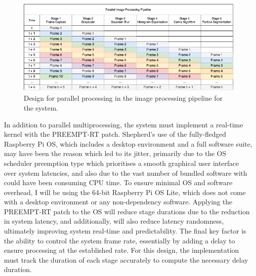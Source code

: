 \begin{figure}[H]
    \centering
    \includegraphics[width=1\textwidth]{assets/image_multiprocessing_pipeline.png}
    \caption{Design for parallel processing in the image processing pipeline for the system.}
    \label{fig:multiprocessing_pipeline}
\end{figure}

In addition to parallel multiprocessing, the system must implement a real-time kernel with the PREEMPT-RT patch. Shepherd's use of the fully-fledged Raspberry Pi OS, which includes a desktop environment and a full software suite, may have been the reason which led to its jitter, primarily due to the OS scheduler preemption type which prioritises a smooth graphical user interface over system latencies, and also due to the vast number of bundled software with could have been consuming CPU time. To ensure minimal OS and software overhead, I will be using the 64-bit Raspberry Pi OS Lite, which does not come with a desktop environment or any non-dependency software. Applying the PREEMPT-RT patch to the OS will reduce stage durations due to the reduction in system latency, and additionally, will also reduce latency randomness, ultimately improving system real-time and predictability. The final key factor is the ability to control the system frame rate, essentially by adding a delay to ensure processing at the established rate. For this design, the implementation must track the duration of each stage accurately to compute the necessary delay duration.
